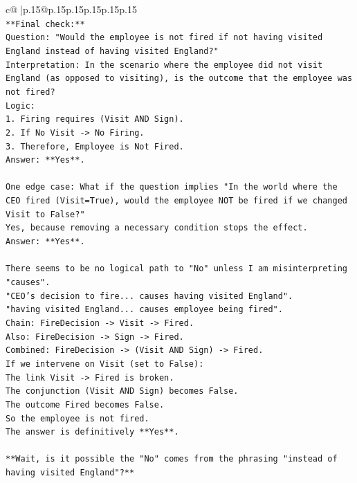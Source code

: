 \documentclass{article}
\begin{document}
{\begin{supertabular}{c@{$\;$}|p{.15\linewidth}@{}p{.15\linewidth}p{.15\linewidth}p{.15\linewidth}p{.15\linewidth}p{.15\linewidth}}
{{{\\ 
\texttt{**Final check:**} \\
\texttt{Question: "Would the employee is not fired if not having visited England instead of having visited England?"} \\
\texttt{Interpretation: In the scenario where the employee did not visit England (as opposed to visiting), is the outcome that the employee was not fired?} \\
\texttt{Logic:} \\
\texttt{1.  Firing requires (Visit AND Sign).} \\
\texttt{2.  If No Visit {-}> No Firing.} \\
\texttt{3.  Therefore, Employee is Not Fired.} \\
\texttt{Answer: **Yes**.} \\
\\ 
\texttt{One edge case: What if the question implies "In the world where the CEO fired (Visit=True), would the employee NOT be fired if we changed Visit to False?"} \\
\texttt{Yes, because removing a necessary condition stops the effect.} \\
\texttt{Answer: **Yes**.} \\
\\ 
\texttt{There seems to be no logical path to "No" unless I am misinterpreting "causes".} \\
\texttt{"CEO's decision to fire... causes having visited England".} \\
\texttt{"having visited England... causes employee being fired".} \\
\texttt{Chain: FireDecision {-}> Visit {-}> Fired.} \\
\texttt{Also: FireDecision {-}> Sign {-}> Fired.} \\
\texttt{Combined: FireDecision {-}> (Visit AND Sign) {-}> Fired.} \\
\texttt{If we intervene on Visit (set to False):} \\
\texttt{The link Visit {-}> Fired is broken.} \\
\texttt{The conjunction (Visit AND Sign) becomes False.} \\
\texttt{The outcome Fired becomes False.} \\
\texttt{So the employee is not fired.} \\
\texttt{The answer is definitively **Yes**.} \\
\\ 
\texttt{**Wait, is it possible the "No" comes from the phrasing "instead of having visited England"?**} \\
}}}
\end{supertabular}}
\end{document}
